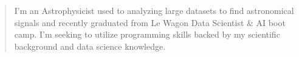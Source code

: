 \documentclass[10pt,a4paper,ragged2e,withhyper]{altacv}
\begin{document}


\makecvheader


\begin{quote}
I'm an Astrophysicist used to analyzing large datasets to find astronomical signals and recently graduated from Le Wagon Data Scientist \& AI boot camp. I'm seeking to utilize programming skills backed by my scientific background and data science knowledge.
\end{quote}

\end{document}
